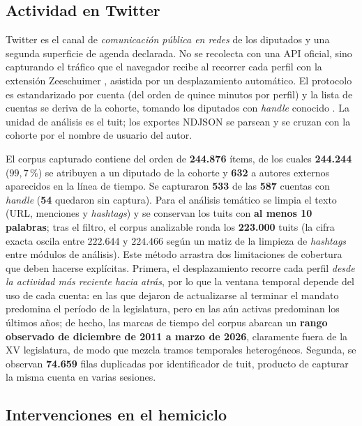 \subsection{Actividad en Twitter}
\label{sec:corpus-twitter}

Twitter es el canal de \emph{comunicación pública en redes} de los diputados y
una segunda superficie de agenda declarada. No se recolecta con una API oficial,
sino capturando el tráfico que el navegador recibe al recorrer cada perfil con la
extensión Zeeschuimer \cite{peeters2022zeeschuimer}, asistida por un
desplazamiento automático. El protocolo es estandarizado por cuenta (del orden de
quince minutos por perfil) y la lista de cuentas se deriva de la cohorte, tomando
los diputados con \emph{handle} conocido \cite{regardscitoyens_twitter}. La
unidad de análisis es el tuit; los exportes NDJSON se parsean y se cruzan con la
cohorte por el nombre de usuario del autor.

El corpus capturado contiene del orden de \textbf{244.876} ítems, de los cuales
\textbf{244.244} ($99{,}7\,\%$) se atribuyen a un diputado de la cohorte y
\textbf{632} a autores externos aparecidos en la línea de tiempo. Se capturaron
\textbf{533} de las \textbf{587} cuentas con \emph{handle} (\textbf{54} quedaron
sin captura). Para el análisis temático se limpia el texto (URL, menciones y
\emph{hashtags}) y se conservan los tuits con \textbf{al menos 10 palabras}; tras
el filtro, el corpus analizable ronda los \textbf{223.000} tuits (la cifra exacta
oscila entre $222.644$ y $224.466$ según un matiz de la limpieza de
\emph{hashtags} entre módulos de análisis). Este método arrastra dos limitaciones
de cobertura que deben hacerse explícitas. Primera, el desplazamiento recorre cada
perfil \emph{desde la actividad más reciente hacia atrás}, por lo que la ventana
temporal depende del uso de cada cuenta: en las que dejaron de actualizarse al
terminar el mandato predomina el período de la legislatura, pero en las aún
activas predominan los últimos años; de hecho, las marcas de tiempo del corpus
abarcan un \textbf{rango observado de diciembre de 2011 a marzo de 2026},
claramente fuera de la XV legislatura, de modo que mezcla tramos temporales
heterogéneos. Segunda, se observan \textbf{74.659} filas duplicadas por
identificador de tuit, producto de capturar la misma cuenta en varias sesiones.

\subsection{Intervenciones en el hemiciclo}
\label{sec:corpus-hemiciclo}


